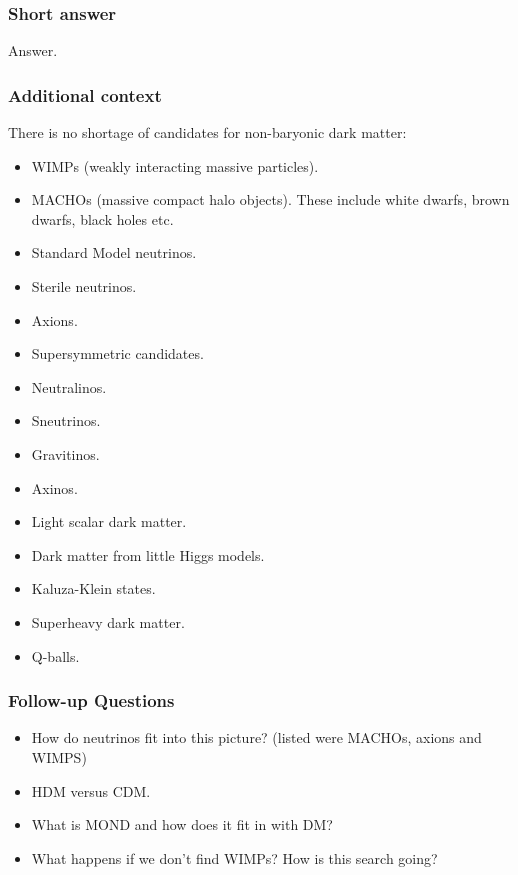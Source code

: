 \documentclass[a4paper,11pt]{article}
\begin{document}
\subsubsection{Short answer}

Answer.

\subsubsection{Additional context}

There is no shortage of candidates for non-baryonic dark matter:

\begin{itemize}
    \item WIMPs (weakly interacting massive particles). 
    \item MACHOs (massive compact halo objects). These include white dwarfs, brown dwarfs, black holes etc.
    \item Standard Model neutrinos.
    \item Sterile neutrinos.
    \item Axions. 
    \item Supersymmetric candidates.
        \item Neutralinos.
        \item Sneutrinos.
        \item Gravitinos.
        \item Axinos.
    \item Light scalar dark matter.
    \item Dark matter from little Higgs models.
    \item Kaluza-Klein states.
    \item Superheavy dark matter.
    \item Q-balls.
\end{itemize}

\subsubsection{Follow-up Questions}

\begin{itemize}
    \item How do neutrinos fit into this picture? (listed were MACHOs, axions and WIMPS)
    \item HDM versus CDM.
    \item What is MOND and how does it fit in with DM?
    \item What happens if we don't find WIMPs? How is this search going?
\end{itemize}
\end{document}
